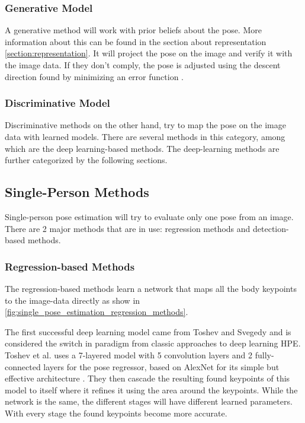 \subsubsection{Generative Model}
A generative method will work with prior beliefs about the pose.
More information about this can be found in the section about representation \ref{section:representation}.
It will project the pose on the image and verify it with the image data.
If they don't comply, the pose is adjusted using the descent direction found by minimizing an error function \cite{Pons-Moll2011}.

\subsubsection{Discriminative Model}
Discriminative methods on the other hand, try to map the pose on the image data with learned models.
There are several methods in this category, among which are the deep learning-based methods.
The deep-learning methods are further categorized by the following sections.

\subsection{Single-Person Methods}
Single-person pose estimation will try to evaluate only one pose from an image.
There are 2 major methods that are in use: regression methods and detection-based methods.

\subsubsection{Regression-based Methods}
The regression-based methods learn a network that maps all the body keypoints to the image-data directly as show in \ref{fig:single_pose_estimation_regression_methods}.

The first successful deep learning model came from Toshev and Svegedy \cite{Toshev2014} and is considered the switch in paradigm from classic approaches to deep learning \gls{HPE}.
Toshev et al. uses a 7-layered model with 5 convolution layers and 2 fully-connected layers for the pose regressor, based on AlexNet for its simple but effective architecture \cite{AlexNet}.
They then cascade the resulting found keypoints of this model to itself where it refines it using the area around the keypoints.
While the network is the same, the different stages will have different learned parameters.
With every stage the found keypoints become more accurate.

